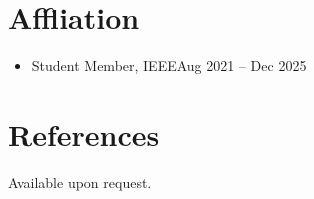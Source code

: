 \documentclass[10pt,margin,line,pifont,palatino,courier]{res}
\begin{document}
\begin{resume}
\section{\sc Affliation}

\begin{itemize}[leftmargin=*]
    \item Student Member, IEEE\hfill Aug 2021 -- Dec 2025
\end{itemize}

\section{\sc References}
{\sc Available upon request.}

%


\end{resume}
\end{document}
